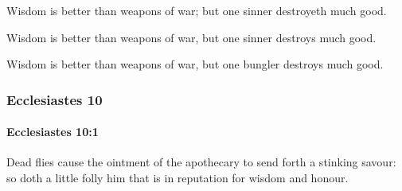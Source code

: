 			\begin{versebox}
					\item[BHS] 
					\item[LXX] 
					\item[ASV] Wisdom is better than weapons of war; but one sinner destroyeth much good.
					\item[NIV] Wisdom is better than weapons of war, but one sinner destroys much good.
					\item[NRSV] Wisdom is better than weapons of war, but one bungler destroys much good.
			\end{versebox}
	\subsubsection{Ecclesiastes 10} %
		\label{ECCLESIASTES-10}

		\paragraph{Ecclesiastes 10:1} %
			\label{ECCLESIASTES-10-1}

			Dead flies cause the ointment of the apothecary to send forth a stinking savour: so doth a little folly him that is in reputation for wisdom and honour.

